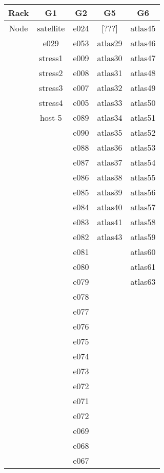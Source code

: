 \documentclass[10pt,letterpaper]{article}
\begin{document}
        \begin{center}
        \begin{tabular}{ |c|c|c|c|c| }
        \hline
        Rack & G1 & G2 & G5 & G6 \\
        \hline
        \multirow{1}{3em}{Node}

        & satellite & e024 & [???]   & atlas45 \\
        & e029    & e053   & atlas29 & atlas46 \\
        & stress1 & e009   & atlas30 & atlas47 \\
        & stress2 & e008   & atlas31 & atlas48 \\
        & stress3 & e007   & atlas32 & atlas49 \\
        & stress4 & e005   & atlas33 & atlas50 \\
        & host-5  & e089   & atlas34 & atlas51 \\
        &         & e090   & atlas35 & atlas52 \\
        &         & e088   & atlas36 & atlas53 \\
        &         & e087   & atlas37 & atlas54 \\
        &         & e086   & atlas38 & atlas55 \\
        &         & e085   & atlas39 & atlas56 \\
        &         & e084   & atlas40 & atlas57 \\
        &         & e083   & atlas41 & atlas58 \\
        &         & e082   & atlas43 & atlas59 \\
        &         & e081   &         & atlas60 \\
        &         & e080   &         & atlas61 \\
        &         & e079   &         & atlas63 \\
        &         & e078 &&\\
        &         & e077 &&\\
        &         & e076 &&\\
        &         & e075 &&\\
        &         & e074 &&\\
        &         & e073 &&\\
        &         & e072 &&\\
        &         & e071 &&\\
        &         & e072 &&\\
        &         & e069 &&\\
        &         & e068 &&\\
        &         & e067 &&\\

        \hline
        \end{tabular}
        \end{center}
\end{document}
